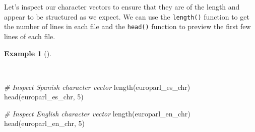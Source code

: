 \documentclass[
  letterpaper,
]{latex/krantz}
\newenvironment{Shaded}{\begin{snugshade}}{\end{snugshade}}
\newcommand{\CommentTok}[1]{\textcolor[rgb]{0.00,0.00,0.00}{\textit{#1}}}
\newcommand{\DecValTok}[1]{\textcolor[rgb]{0.00,0.00,0.00}{#1}}
\newcommand{\FunctionTok}[1]{\textcolor[rgb]{0.00,0.00,0.00}{#1}}
\newcommand{\NormalTok}[1]{\textcolor[rgb]{0.00,0.00,0.00}{#1}}
\theoremstyle{definition}
\newtheorem{example}{Example}[chapter]
\theoremstyle{remark}
\begin{document}
Let's inspect our character vectors to ensure that they are of the
length and appear to be structured as we expect. We can use the
\texttt{length()} function to get the number of lines in each file and
the \texttt{head()} function to preview the first few lines of each
file.

\begin{example}[]\protect\hypertarget{exm-cd-europarl-inspect-chr}{}\label{exm-cd-europarl-inspect-chr}

~

\begin{Shaded}
\begin{Highlighting}[]
\CommentTok{\# Inspect Spanish character vector}
\FunctionTok{length}\NormalTok{(europarl\_es\_chr)}
\FunctionTok{head}\NormalTok{(europarl\_es\_chr, }\DecValTok{5}\NormalTok{)}

\CommentTok{\# Inspect English character vector}
\FunctionTok{length}\NormalTok{(europarl\_en\_chr)}
\FunctionTok{head}\NormalTok{(europarl\_en\_chr, }\DecValTok{5}\NormalTok{)}
\end{Highlighting}
\end{Shaded}


\end{example}
\end{document}
